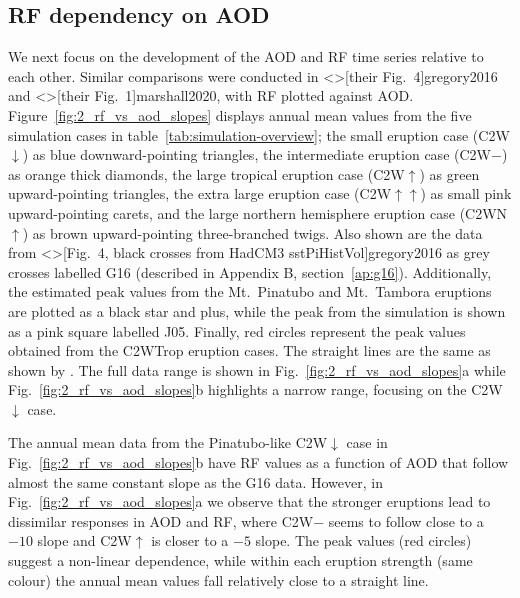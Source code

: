 \documentclass[draft]{agujournal2019}
\begin{document}
\subsection{RF dependency on AOD}

We next focus on the development of the AOD and RF time series relative to each other.
Similar comparisons were conducted in \citeA<>[their Fig.\ 4]{gregory2016} and
\citeA<>[their Fig.\ 1]{marshall2020}, with RF plotted against AOD.
Figure~\ref{fig:2_rf_vs_aod_slopes} displays annual mean values from the five simulation
cases in table~\ref{tab:simulation-overview}; the small eruption case
(C2W\(\downarrow\)) as blue downward-pointing triangles, the intermediate eruption case
(C2W\(-\)) as orange thick diamonds, the large tropical eruption case (C2W\(\uparrow\))
as green upward-pointing triangles, the extra large eruption case
(C2W\(\uparrow\uparrow\)) as small pink upward-pointing carets, and the large northern
hemisphere eruption case (C2WN\(\uparrow\)) as brown upward-pointing three-branched
twigs. Also shown are the data from \citeA<>[Fig.\ 4, black crosses from HadCM3
  sstPiHistVol]{gregory2016} as grey crosses labelled G16 (described in Appendix B,
section~\ref{ap:g16}). Additionally, the estimated peak values from the Mt.\ Pinatubo
and Mt.\ Tambora eruptions are plotted as a black star and plus, while the peak from the
 simulation is shown as a pink square labelled J05. Finally, red
circles represent the peak values obtained from the C2WTrop eruption cases. The straight
lines are the same as shown by . The full data range is shown in
Fig.~\ref{fig:2_rf_vs_aod_slopes}a while Fig.~\ref{fig:2_rf_vs_aod_slopes}b highlights a
narrow range, focusing on the C2W\(\downarrow\) case.

The annual mean data from the Pinatubo-like C2W\(\downarrow\) case in
Fig.~\ref{fig:2_rf_vs_aod_slopes}b have RF values as a function of AOD that follow
almost the same constant slope as the G16 data. However, in
Fig.~\ref{fig:2_rf_vs_aod_slopes}a we observe that the stronger eruptions lead to
dissimilar responses in AOD and RF, where C2W\(-\) seems to follow close to a \(-10\)
slope and C2W\(\uparrow\) is closer to a \(-5\) slope. The peak values (red circles)
suggest a non-linear dependence, while within each eruption strength (same colour) the
annual mean values fall relatively close to a straight line.
\end{document}
